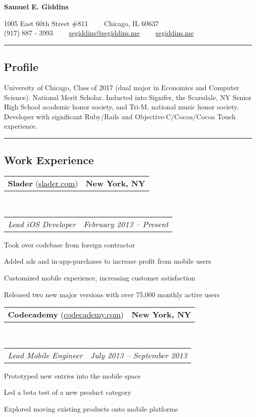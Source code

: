 \documentclass[10pt,letterpaper]{article}
\makeatletter
\newcommand{\headerrow}[2]
{\noindent \begin{tabular*}{\linewidth}{l@{\extracolsep{\fill}}r}
	#1 &
	#2 \\
\end{tabular*}}
\newcommand{\ahref}[1]
{\href{http://#1}{#1}}
\makeatother
\begin{document}
\begin{center}
{\LARGE \textbf{Samuel E. Giddins}}

1005 East 60th Street \#811\ \ \textbullet
\ \ Chicago, IL 60637
\\
(917) 887 - 3993\ \ \textbullet
\ \ \href{mailto:segiddins@segiddins.me}{segiddins@segiddins.me}\ \ \textbullet
\ \ \ahref{segiddins.me}
\end{center}

\hrule
\vspace{-0.4em}
\subsection*{Profile}
University of Chicago, Class of 2017 (dual major in Economics and Computer Science).
National Merit Scholar.
Inducted into Signifer, the Scarsdale, NY Senior High School academic honor society, and Tri-M, national music honor society.
Developer with significant Ruby/Rails and Objective-C/Cocoa/Cocoa Touch experience.

\vspace{0.8em}
\hrule
\vspace{-0.4em}
\subsection*{Work Experience}


	\headerrow
		{\textbf{Slader} (\ahref{slader.com})}
		{\textbf{New York, NY}}
	\\
	\headerrow
		{\emph{Lead iOS Developer}}
		{\emph{February 2013 -- Present}}
	\begin{itemize*}
		\item Took over codebase from foreign contractor
		\item Added ads and in-app-purchases to increase profit from mobile users
		\item Customized mobile experience, increasing customer satisfaction
		\item Released two new major versions with over 75,000 monthly active users
	\end{itemize*}

	\headerrow
		{\textbf{Codecademy} (\ahref{codecademy.com})}
		{\textbf{New York, NY}}
	\\
	\headerrow
		{\emph{Lead Mobile Engineer}}
		{\emph{July 2013 -- September 2013}}
	\begin{itemize*}
		\item Prototyped new entries into the mobile space
		\item Led a beta test of a new product category
		\item Explored moving existing products onto mobile platforms
	\end{itemize*}
\end{document}
